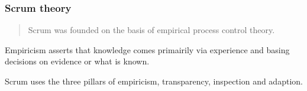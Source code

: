 \subsubsection{Scrum theory}

\begin{quotation}
Scrum was founded on the basis of empirical process control theory\cite{scrumguide11}.
\end{quotation}

Empiricism asserts that knowledge comes primairily via experience and basing 
decisions on evidence or what is known\cite{scrumguide11}.

Scrum uses the three pillars of empiricism, transparency, inspection and 
adaption\cite{scrumguide11}.




